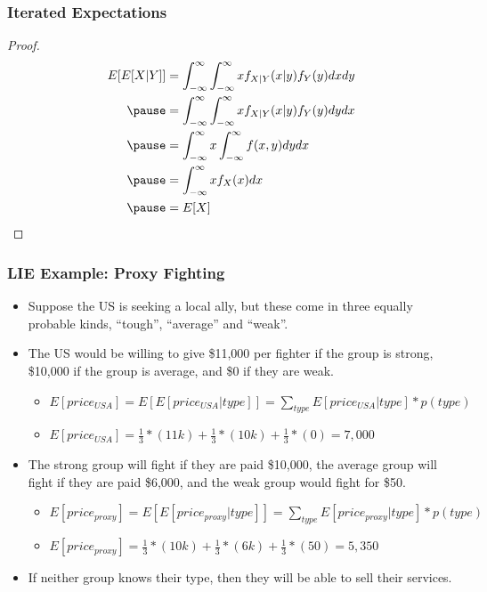 \documentclass[aspectratio=169, handout]{beamer}
\numberwithin{equation}{section}
\begin{document}
\begin{frame}
\frametitle{Iterated Expectations}

\begin{proof}
\begin{align*}
E[E[X|Y]] &= \int_{-\infty}^{\infty}  \int_{-\infty}^{\infty} x f_{X|Y} (x|y) f_{Y}(y) dx dy  \\ \pause 
&=  \int_{-\infty}^{\infty}  \int_{-\infty}^{\infty} x f_{X|Y} (x|y) f_{Y}(y) dy dx  \\ \pause 
&= \int_{-\infty}^{\infty} x \int_{-\infty}^{\infty}  f(x, y) dy dx   \\ \pause 
&= \int_{-\infty}^{\infty}  x f_{X}(x) dx   \\ \pause 
&= E[X]  
\end{align*}
\end{proof}
\end{frame}


\begin{frame}
\frametitle{LIE Example: Proxy Fighting}
\begin{itemize}
\item  Suppose the US is seeking a local ally, but these come in three equally probable kinds, ``tough'', ``average'' and ``weak''.
\item The US would be willing to give \$11,000 per fighter if the group is strong, \$10,000 if the group is average, and \$0 if they are weak.\pause
\begin{itemize}
\item $E[price_{USA}]=E[E[price_{USA}|type]]=\sum_{type}E[price_{USA}|type]*p(type)$\pause
\item $E[price_{USA}]=\frac{1}{3}*(11k)+\frac{1}{3}*(10k)+\frac{1}{3}*(0)=7,000$\pause

\end{itemize}
\item The strong group will fight if they are paid \$10,000, the average group will fight if they are paid \$6,000, and the weak group would fight for \$50.\pause
\begin{itemize}
\item $E[price_{proxy}]=E[E[price_{proxy}|type]]=\sum_{type}E[price_{proxy}|type]*p(type)$\pause
\item $E[price_{proxy}]=\frac{1}{3}*(10k)+\frac{1}{3}*(6k)+\frac{1}{3}*(50)=5,350$\pause
\end{itemize}
\item If neither group knows their type, then they will be able to sell their services.
\end{itemize}
\end{frame}
\end{document}
